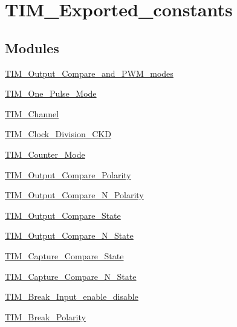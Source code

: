 \hypertarget{group___t_i_m___exported__constants}{\section{T\-I\-M\-\_\-\-Exported\-\_\-constants}
\label{group___t_i_m___exported__constants}
}
\subsection*{Modules}
\begin{DoxyCompactItemize}
\item 
\hyperlink{group___t_i_m___output___compare__and___p_w_m__modes}{T\-I\-M\-\_\-\-Output\-\_\-\-Compare\-\_\-and\-\_\-\-P\-W\-M\-\_\-modes}
\item 
\hyperlink{group___t_i_m___one___pulse___mode}{T\-I\-M\-\_\-\-One\-\_\-\-Pulse\-\_\-\-Mode}
\item 
\hyperlink{group___t_i_m___channel}{T\-I\-M\-\_\-\-Channel}
\item 
\hyperlink{group___t_i_m___clock___division___c_k_d}{T\-I\-M\-\_\-\-Clock\-\_\-\-Division\-\_\-\-C\-K\-D}
\item 
\hyperlink{group___t_i_m___counter___mode}{T\-I\-M\-\_\-\-Counter\-\_\-\-Mode}
\item 
\hyperlink{group___t_i_m___output___compare___polarity}{T\-I\-M\-\_\-\-Output\-\_\-\-Compare\-\_\-\-Polarity}
\item 
\hyperlink{group___t_i_m___output___compare___n___polarity}{T\-I\-M\-\_\-\-Output\-\_\-\-Compare\-\_\-\-N\-\_\-\-Polarity}
\item 
\hyperlink{group___t_i_m___output___compare___state}{T\-I\-M\-\_\-\-Output\-\_\-\-Compare\-\_\-\-State}
\item 
\hyperlink{group___t_i_m___output___compare___n___state}{T\-I\-M\-\_\-\-Output\-\_\-\-Compare\-\_\-\-N\-\_\-\-State}
\item 
\hyperlink{group___t_i_m___capture___compare___state}{T\-I\-M\-\_\-\-Capture\-\_\-\-Compare\-\_\-\-State}
\item 
\hyperlink{group___t_i_m___capture___compare___n___state}{T\-I\-M\-\_\-\-Capture\-\_\-\-Compare\-\_\-\-N\-\_\-\-State}
\item 
\hyperlink{group___t_i_m___break___input__enable__disable}{T\-I\-M\-\_\-\-Break\-\_\-\-Input\-\_\-enable\-\_\-disable}
\item 
\hyperlink{group___t_i_m___break___polarity}{T\-I\-M\-\_\-\-Break\-\_\-\-Polarity}

\end{DoxyCompactItemize}
